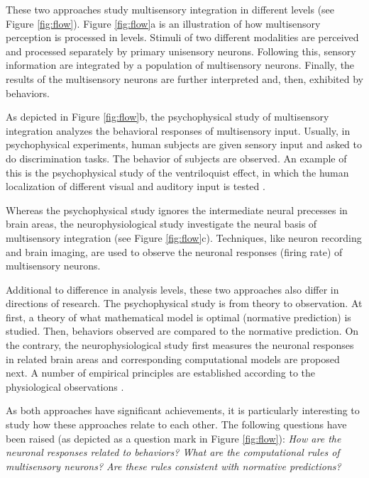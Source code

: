 \documentclass{article}[11pt]
\begin{document}
These two approaches study multisensory integration in different levels (see Figure \ref{fig:flow}).
Figure \ref{fig:flow}a is an illustration of how multisensory perception is processed in levels. Stimuli of two different modalities are perceived and processed separately by primary unisensory neurons. Following this, sensory information are integrated by a population of multisensory neurons. Finally, the results of the multisensory neurons are further interpreted and, then, exhibited by behaviors.

As depicted in Figure \ref{fig:flow}b, the psychophysical study of multisensory integration analyzes the behavioral responses of multisensory input. Usually, in psychophysical experiments, human subjects are given sensory input and asked to do discrimination tasks. The behavior of subjects are observed. An example of this is the psychophysical study of the ventriloquist effect, in which the human localization of different visual and auditory input is tested \cite{alais_ventriloquist_2004}.

Whereas the psychophysical study ignores the intermediate neural precesses in brain areas, the neurophysiological study investigate the neural basis of multisensory integration (see Figure \ref{fig:flow}c). Techniques, like neuron recording and brain imaging, are used to observe the neuronal responses (firing rate) of multisensory neurons.

Additional to difference in analysis levels, these two approaches also differ in directions of research. The psychophysical study is from theory to observation. At first, a theory of what mathematical model is optimal (normative prediction) is studied. Then, behaviors observed are compared to the normative prediction. On the contrary, the neurophysiological study first measures the neuronal responses in related brain areas and corresponding computational models are proposed next. A number of empirical principles are established according to the physiological observations \cite{stein_merging_1993, stanford_evaluating_2005}.

As both approaches have significant achievements, it is particularly interesting to study how these approaches relate to each other. The following questions have been raised (as depicted as a question mark in Figure \ref{fig:flow}): \emph{How are the neuronal responses related to behaviors? What are the computational rules of multisensory neurons? Are these rules consistent with normative predictions?} 

\end{document}
